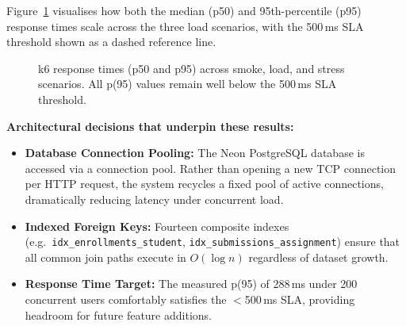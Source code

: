 \documentclass[12pt, a4paper]{report}
\begin{document}
Figure~\ref{fig:k6chart} visualises how both the median (p50) and 95th-percentile (p95) response times scale across the three load scenarios, with the 500\,ms SLA threshold shown as a dashed reference line.

\begin{figure}[H]
\centering
{}
\caption{k6 response times (p50 and p95) across smoke, load, and stress scenarios. All p(95) values remain well below the 500\,ms SLA threshold.}
\label{fig:k6chart}
\end{figure}

\textbf{Architectural decisions that underpin these results:}
\begin{itemize}[noitemsep]
    \item \textbf{Database Connection Pooling:} The Neon PostgreSQL database is accessed via a connection pool. Rather than opening a new TCP connection per HTTP request, the system recycles a fixed pool of active connections, dramatically reducing latency under concurrent load.
    \item \textbf{Indexed Foreign Keys:} Fourteen composite indexes (e.g.\ \texttt{idx\_enrollments\_student}, \texttt{idx\_submissions\_assignment}) ensure that all common join paths execute in $O(\log n)$ regardless of dataset growth.
    \item \textbf{Response Time Target:} The measured p(95) of 288\,ms under 200 concurrent users comfortably satisfies the $<$500\,ms SLA, providing headroom for future feature additions.
\end{itemize}
\end{document}
